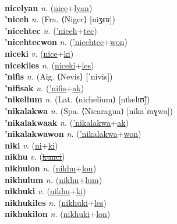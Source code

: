  \label{nicelumah} \\
\textbf{nicelyan} \textit{n.} (\hyperref[nice]{nice}+\hyperref[lyan]{lyan})
 \label{nicelyan} \\
\textbf{'niceh} \textit{n.} (Fra. ⟨Niger⟩ [niʒɛʁ])
 \label{'niceh} \\
\textbf{'nicehtec} \textit{n.} (\hyperref['niceh]{'niceh}+\hyperref[tec]{tec})
 \label{'nicehtec} \\
\textbf{'nicehtecwon} \textit{n.} (\hyperref['nicehtec]{'nicehtec}+\hyperref[won]{won})
 \label{'nicehtecwon} \\
\textbf{niceki} \textit{v.} (\hyperref[nice]{nice}+\hyperref[ki]{ki})
 \label{niceki} \\
\textbf{nicekiles} \textit{n.} (\hyperref[niceki]{niceki}+\hyperref[les]{les})
 \label{nicekiles} \\
\textbf{'nifis} \textit{n.} (Aig. ⟨Nevis⟩ [ˈnivis])
 \label{'nifis} \\
\textbf{'nifisak} \textit{n.} (\hyperref['nifis]{'nifis}+\hyperref[ak]{ak})
 \label{'nifisak} \\
\textbf{'nikelium} \textit{n.} (Lat. ⟨nichelium⟩ [nɪkelɪʊ̃])
 \label{'nikelium} \\
\textbf{'nikalakwa} \textit{n.} (Spa. ⟨Nicaragua⟩ [nikaˈɾaɣwa])
 \label{'nikalakwa} \\
\textbf{'nikalakwaak} \textit{n.} (\hyperref['nikalakwa]{'nikalakwa}+\hyperref[ak]{ak})
 \label{'nikalakwaak} \\
\textbf{'nikalakwawon} \textit{n.} (\hyperref['nikalakwa]{'nikalakwa}+\hyperref[won]{won})
 \label{'nikalakwawon} \\
\textbf{niki} \textit{v.} (\hyperref[ni]{ni}+\hyperref[ki]{ki})
 \label{niki} \\
\textbf{nikhu} \textit{v.} (\hyperref[kunci]{\sout{kunci}})
 \label{nikhu} \\
\textbf{nikhulon} \textit{n.} (\hyperref[nikhu]{nikhu}+\hyperref[lon]{lon})
 \label{nikhulon} \\
\textbf{nikhulum} \textit{n.} (\hyperref[nikhu]{nikhu}+\hyperref[lum]{lum})
 \label{nikhulum} \\
\textbf{nikhuki} \textit{v.} (\hyperref[nikhu]{nikhu}+\hyperref[ki]{ki})
 \label{nikhuki} \\
\textbf{nikhukiles} \textit{n.} (\hyperref[nikhuki]{nikhuki}+\hyperref[les]{les})
 \label{nikhukiles} \\
\textbf{nikhukilon} \textit{n.} (\hyperref[nikhuki]{nikhuki}+\hyperref[lon]{lon})
 \label{nikhukilon} \\
